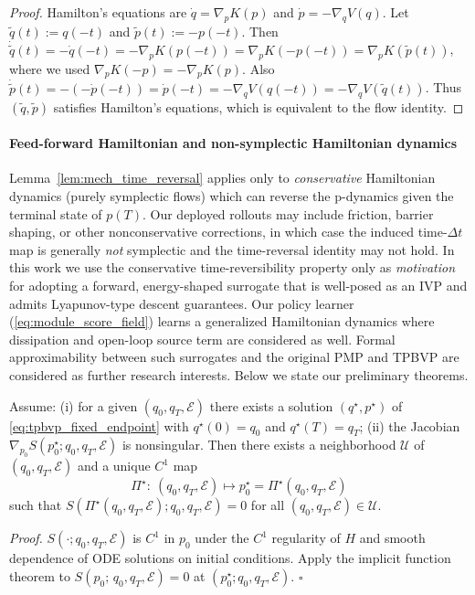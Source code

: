 \begin{proof}
Hamilton's equations are $\dot q=\nabla_p K(p)$ and $\dot p=-\nabla_q V(q)$.
Let $\tilde q(t):=q(-t)$ and $\tilde p(t):=-p(-t)$.
Then $\dot{\tilde q}(t)=-\dot q(-t)=-\nabla_p K(p(-t))=\nabla_p K(-p(-t))=\nabla_p K(\tilde p(t))$,
where we used $\nabla_p K(-p)=-\nabla_p K(p)$.
Also $\dot{\tilde p}(t)=-(-\dot p(-t))=\dot p(-t)=-\nabla_q V(q(-t))=-\nabla_q V(\tilde q(t))$. Thus $(\tilde q,\tilde p)$ satisfies Hamilton's equations, which is equivalent to the flow identity.
\end{proof}

\paragraph{ Feed-forward Hamiltonian and non-symplectic Hamiltonian dynamics}
Lemma~\ref{lem:mech_time_reversal} applies only to \emph{conservative} Hamiltonian dynamics (purely symplectic flows) which can reverse the p-dynamics given the terminal state of $p(T)$. Our deployed rollouts may include friction, barrier shaping, or other nonconservative corrections, in which case the induced
time-$\Delta t$ map is generally \emph{not} symplectic and the time-reversal identity may not hold.
In this work we use the conservative time-reversibility property only as \emph{motivation} for adopting a forward,
energy-shaped surrogate that is well-posed as an IVP and admits
Lyapunov-type descent guarantees. Our policy learner (\cref{eq:module_score_field}) learns a generalized Hamiltonian dynamics where dissipation and open-loop source term are considered as well. Formal approximability between such surrogates and the original PMP and TPBVP are considered as further research interests. Below we state our preliminary theorems.

\begin{theorem}
\label{thm:ift_costate}
Assume: (i) for a given $(q_0,q_T,\mathcal E)$ there exists a solution $(q^\star,p^\star)$ of \cref{eq:tpbvp_fixed_endpoint}
with $q^\star(0)=q_0$ and $q^\star(T)=q_T$;
(ii) the Jacobian $\nabla_{p_0}S(p_0^\star;q_0,q_T,\mathcal E)$ is nonsingular.
Then there exists a neighborhood $\mathcal U$ of $(q_0,q_T,\mathcal E)$ and a unique $C^1$ map
\[
\Pi^\star:\ (q_0,q_T,\mathcal E)\mapsto p_0^\star=\Pi^\star(q_0,q_T,\mathcal E)
\]
such that $S(\Pi^\star(q_0,q_T,\mathcal E);q_0,q_T,\mathcal E)=0$ for all $(q_0,q_T,\mathcal E)\in\mathcal U$.
\end{theorem}
\emph{Proof.} $S(\cdot;q_0,q_T,\mathcal E)$ is $C^1$ in $p_0$ under the $C^1$ regularity of $H$ and smooth dependence of ODE solutions on initial conditions.
Apply the implicit function theorem to $S(p_0;\,q_0,q_T,\mathcal E)=0$ at $(p_0^\star;q_0,q_T,\mathcal E)$. $\square$

